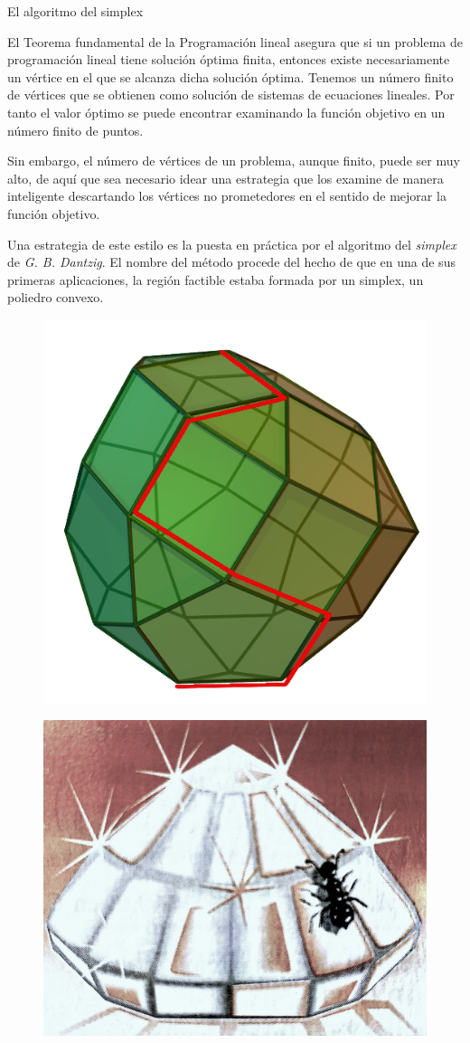 \begin{myblock}{El algoritmo del simplex}
\begin{small}
\vspace{2mm} El Teorema fundamental de la Programación lineal asegura que si un problema de programación lineal tiene solución óptima finita, entonces existe necesariamente un vértice en el que se alcanza dicha solución óptima. Tenemos un número finito de vértices que se obtienen como solución de sistemas de ecuaciones lineales. Por tanto el valor óptimo se puede encontrar examinando la función objetivo en un número finito de puntos.

\vspace{2mm} Sin embargo, el número de vértices de un problema, aunque finito, puede ser muy alto, de aquí que sea necesario idear una estrategia que los examine de manera inteligente descartando los vértices no prometedores en el sentido de mejorar la función objetivo.

\vspace{2mm} Una estrategia de este estilo es la puesta en práctica por el algoritmo del \emph{simplex} de \emph{G. B. Dantzig}. El nombre del método procede del hecho de que en una de sus primeras aplicaciones, la región factible estaba formada por un simplex, un poliedro convexo.
\begin{multicols}{2}
	\begin{figure}[H]
	\centering
	\includegraphics[width=.35\textwidth]{imagenes/simplex3.png}
\end{figure}\begin{figure}[H]
	\centering
	\includegraphics[width=.4\textwidth]{imagenes/simplex2.png}
\end{figure}
\end{multicols}


\end{small}
\end{myblock}
